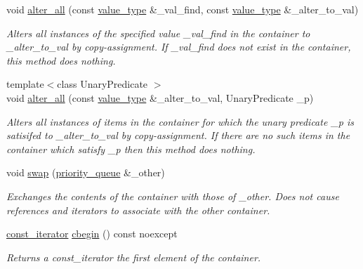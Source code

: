\begin{DoxyCompactItemize}
void \hyperlink{classcrsc_1_1priority__queue_a97d76087502f3213ee56ff2391a11111}{alter\+\_\+all} (const \hyperlink{classcrsc_1_1priority__queue_a2a7d77c9465b6c918f67021e6eb926d7}{value\+\_\+type} \&\+\_\+val\+\_\+find, const \hyperlink{classcrsc_1_1priority__queue_a2a7d77c9465b6c918f67021e6eb926d7}{value\+\_\+type} \&\+\_\+alter\+\_\+to\+\_\+val)
\begin{DoxyCompactList}\small\item\em Alters all instances of the specified value {\ttfamily \+\_\+val\+\_\+find} in the container to {\ttfamily \+\_\+alter\+\_\+to\+\_\+val} by copy-\/assignment. If {\ttfamily \+\_\+val\+\_\+find} does not exist in the container, this method does nothing. \end{DoxyCompactList}\item 
{\footnotesize template$<$class Unary\+Predicate $>$ }\\void \hyperlink{classcrsc_1_1priority__queue_ac9ee338a0ae1a1f96c37ffed5664a8e0}{alter\+\_\+all} (const \hyperlink{classcrsc_1_1priority__queue_a2a7d77c9465b6c918f67021e6eb926d7}{value\+\_\+type} \&\+\_\+alter\+\_\+to\+\_\+val, Unary\+Predicate \+\_\+p)
\begin{DoxyCompactList}\small\item\em Alters all instances of items in the container for which the unary predicate {\ttfamily \+\_\+p} is satisifed to {\ttfamily \+\_\+alter\+\_\+to\+\_\+val} by copy-\/assignment. If there are no such items in the container which satisfy {\ttfamily \+\_\+p} then this method does nothing. \end{DoxyCompactList}\item 
void \hyperlink{classcrsc_1_1priority__queue_acaf2818cb6bb65a84806fe5e0253a5c5}{swap} (\hyperlink{classcrsc_1_1priority__queue}{priority\+\_\+queue} \&\+\_\+other)
\begin{DoxyCompactList}\small\item\em Exchanges the contents of the container with those of {\ttfamily \+\_\+other}. Does not cause references and iterators to associate with the other container. \end{DoxyCompactList}\item 
\hyperlink{classcrsc_1_1priority__queue_a35736d93262db4fdd6d4a71bf785f9b9}{const\+\_\+iterator} \hyperlink{classcrsc_1_1priority__queue_aee3d3ed7f8581669cfd890333b349fc6}{cbegin} () const  noexcept
\begin{DoxyCompactList}\small\item\em Returns a const\+\_\+iterator the first element of the container. \end{DoxyCompactList}\item 

\end{DoxyCompactItemize}
